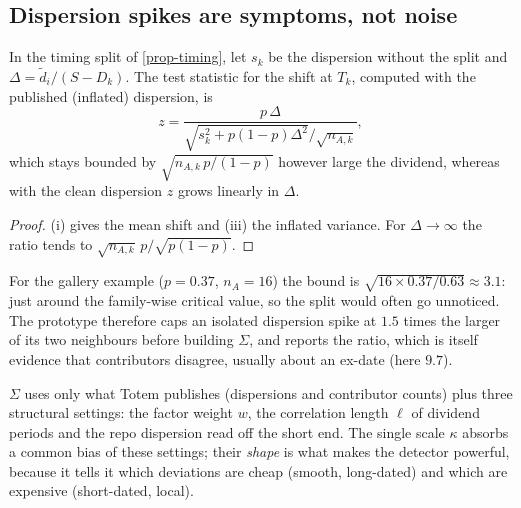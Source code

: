 \subsection{Dispersion spikes are symptoms, not noise}
\begin{proposition}[Masking]\label{prop-masking}
In the timing split of \cref{prop-timing}, let $s_k$ be the dispersion without the split and $\Delta=\tilde d_i/(S-D_k)$.
The test statistic for the shift at $T_k$, computed with the published (inflated) dispersion, is
\begin{equation}\label{eq-masking}
z=\frac{p\,\Delta}{\sqrt{s_k^2+p(1-p)\Delta^2}/\sqrt{n_{A,k}}},
\end{equation}
which stays bounded by $\sqrt{n_{A,k}\,p/(1-p)}$ however large the dividend, whereas with the clean dispersion $z$
grows linearly in $\Delta$.
\end{proposition}
\begin{proof}
(i) gives the mean shift and (iii) the inflated variance. For $\Delta\to\infty$ the ratio tends to
$\sqrt{n_{A,k}}\,p/\sqrt{p(1-p)}$.
\end{proof}

\begin{example}
For the gallery example ($p=0.37$, $n_A=16$) the bound is $\sqrt{16\times0.37/0.63}\approx3.1$: just around the
family-wise critical value, so the split would often go unnoticed. The prototype therefore caps an isolated dispersion
spike at $1.5$ times the larger of its two neighbours before building $\Sigma$, and reports the ratio, which is itself
evidence that contributors disagree, usually about an ex-date (here $9.7$).
\end{example}

\begin{insight}
$\Sigma$ uses only what Totem publishes (dispersions and contributor counts) plus three structural settings: the
factor weight $w$, the correlation length $\ell$ of dividend periods and the repo dispersion read off the short end.
The single scale $\kappa$ absorbs a common bias of these settings; their \emph{shape} is what makes the detector
powerful, because it tells it which deviations are cheap (smooth, long-dated) and which are expensive (short-dated,
local).
\end{insight}
